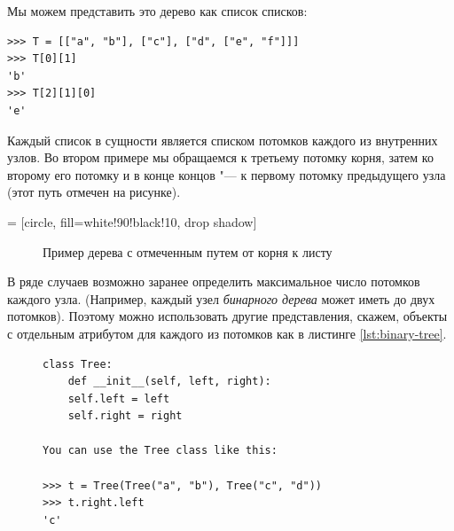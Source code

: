Мы можем представить это дерево как список списков:
\begin{lstlisting}
>>> T = [["a", "b"], ["c"], ["d", ["e", "f"]]]
>>> T[0][1]
'b'
>>> T[2][1][0]
'e'
\end{lstlisting}

Каждый список в сущности является списком потомков каждого из внутренних узлов. Во втором примере мы обращаемся к третьему потомку корня, затем ко второму его потомку и в конце концов "--- к первому потомку предыдущего узла (этот путь отмечен на рисунке).


 = [circle,
						fill=white!90!black!10,
						drop shadow]
\begin{figure}[h]
\centering
{}
\caption{Пример дерева с отмеченным путем от корня к листу}
\label{fig:simple-tree}
\end{figure}


В ряде случаев возможно заранее определить максимальное число потомков каждого узла. (Например, каждый узел \textit{бинарного дерева} может иметь до двух потомков). Поэтому можно использовать другие представления, скажем, объекты с отдельным атрибутом для каждого из потомков как в листинге \ref{lst:binary-tree}.

\begin{figure}[h!]
\begin{lstlisting}[caption={Класс бинарного дерева}, label={lst:binary-tree}]
class Tree:
	def __init__(self, left, right):
	self.left = left
	self.right = right

You can use the Tree class like this:

>>> t = Tree(Tree("a", "b"), Tree("c", "d"))
>>> t.right.left
'c'
\end{lstlisting}
\end{figure}

